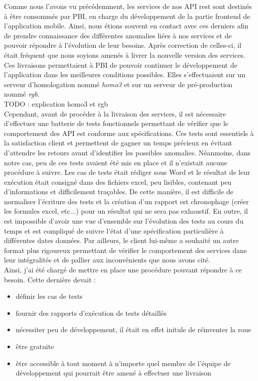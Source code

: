 	Comme nous l'avons vu précédemment, les services de nos API rest sont destinés à être consommés par PBI, en charge du développement de la partie frontend de l'application mobile. Ainsi, nous étions souvent en contact avec ces derniers afin de prendre connaissance des différentes anomalies liées à nos services et de pouvoir répondre à l'évolution de leur besoins. Après correction de celles-ci, il était fréquent que nous soyions amenés à livrer la nouvelle version des services. Ces livraisons permettaient à PBI de pouvoir continuer le développement de l'application dans les meilleures conditions possibles. Elles s'effectuaient sur un serveur d'homologation nommé \textit{homo3} et sur un serveur de pré-production nommé \textit{rgb}. \\
	
	TODO : explication homo3 et rgb\\
	
	Cependant, avant de procéder à la livraison des services, il est nécessaire d'effectuer une batterie de tests fonctionnels permettant de vérifier que le comportement des API est conforme aux spécifications. Ces tests sont essentiels à la satisfaction client et permettent de gagner un temps précieux en évitant d'attendre les retours avant d'identifier les possibles anomalies. Néanmoins, dans notre cas, peu de ces tests avaient été mis en place et il n'existait aucune procédure à suivre. Les cas de tests était rédiger sous Word et le résultat de leur exécution était consigné dans des fichiers excel, peu lisibles, contenant peu d'informations et difficilement traçables. De cette manière, il est difficile de normaliser l'écriture des tests et la création d'un rapport est chronophage (créer les formules excel, etc...) pour un résultat qui ne sera pas exhaustif. En outre, il est impossible d'avoir une vue d'ensemble sur l'évolution des tests au cours du temps et est compliqué de suivre l'état d'une spécification particulière à différentes dates données. Par ailleurs, le client lui-même a souhaité un autre format plus rigoureux permettant de vérifier le comportement des services dans leur intégralités et de pallier aux inconvénients que nous avons cité. \\
	
	Ainsi, j'ai été chargé de mettre en place une procédure pouvant répondre à ce besoin. Cette dernière devait :
	\begin{itemize}
		\item définir les cas de tests
		\item fournir des rapports d'exécution de tests détaillés
		\item nécessiter peu de développement, il était en effet initule de réinventer la roue
		\item être gratuite
		\item être accessible à tout moment à n'importe quel membre de l'équipe de développement qui pourrait être amené à effectuer une livraison
	\end{itemize}
	
	